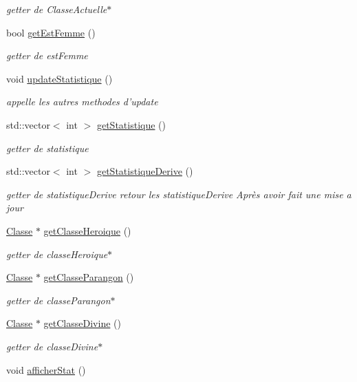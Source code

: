 \begin{DoxyCompactItemize}
\begin{DoxyCompactList}\small\item\em getter de Classe\-Actuelle$\ast$ \end{DoxyCompactList}\item 
bool \hyperlink{classPersonnage_abb94f081188ed8db8a359c71cb1fad15}{get\-Est\-Femme} ()
\begin{DoxyCompactList}\small\item\em getter de est\-Femme \end{DoxyCompactList}\item 
\hypertarget{classPersonnage_a7bddda23478b2aa48404790dde0aeefb}{void \hyperlink{classPersonnage_a7bddda23478b2aa48404790dde0aeefb}{update\-Statistique} ()}\label{classPersonnage_a7bddda23478b2aa48404790dde0aeefb}

\begin{DoxyCompactList}\small\item\em appelle les autres methodes d'update \end{DoxyCompactList}\item 
std\-::vector$<$ int $>$ \hyperlink{classPersonnage_aa3e7743cb3b74039adcdea14f44c6352}{get\-Statistique} ()
\begin{DoxyCompactList}\small\item\em getter de statistique \end{DoxyCompactList}\item 
std\-::vector$<$ int $>$ \hyperlink{classPersonnage_a5bf62bc5df34f14f3c0c9717b61498d5}{get\-Statistique\-Derive} ()
\begin{DoxyCompactList}\small\item\em getter de statistique\-Derive retour les statistique\-Derive Après avoir fait une mise a jour \end{DoxyCompactList}\item 
\hyperlink{classClasse}{Classe} $\ast$ \hyperlink{classPersonnage_ae9d4cf3dc0c47e5652df837c7839efd8}{get\-Classe\-Heroique} ()
\begin{DoxyCompactList}\small\item\em getter de classe\-Heroique$\ast$ \end{DoxyCompactList}\item 
\hyperlink{classClasse}{Classe} $\ast$ \hyperlink{classPersonnage_ad63aa2e6903143a494c72298c90eb7ba}{get\-Classe\-Parangon} ()
\begin{DoxyCompactList}\small\item\em getter de classe\-Parangon$\ast$ \end{DoxyCompactList}\item 
\hyperlink{classClasse}{Classe} $\ast$ \hyperlink{classPersonnage_af072c7506dc955ba44abbacf29c7a4bf}{get\-Classe\-Divine} ()
\begin{DoxyCompactList}\small\item\em getter de classe\-Divine$\ast$ \end{DoxyCompactList}\item 
\hypertarget{classPersonnage_ab3747da2ed7044c6bd2b62fd439d6ad0}{void \hyperlink{classPersonnage_ab3747da2ed7044c6bd2b62fd439d6ad0}{afficher\-Stat} ()}\label{classPersonnage_ab3747da2ed7044c6bd2b62fd439d6ad0}


\end{DoxyCompactItemize}
